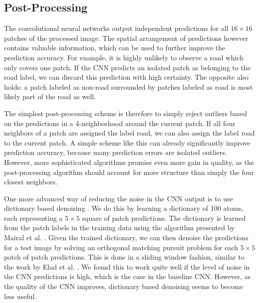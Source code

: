 \documentclass[10pt,conference,compsocconf]{IEEEtran}
\begin{document}
\subsection{Post-Processing}
The convolutional neural networks output independent predictions for all $ 16 \times 16 $ patches of the processed image. The spatial arrangement of predictions however contains valuable information, which can be used to further improve the prediction accuracy. For example, it is highly unlikely to observe a road which only covers one patch. If the CNN predicts an isolated patch as belonging to the road label, we can discard this prediction with high certainty. The opposite also holds: a patch labeled as non-road surrounded by patches labeled as road is most likely part of the road as well.

\par 
The simplest post-processing scheme is therefore to simply reject outliers based on the predictions in a 4-neighborhood around the current patch. If all four neighbors of a patch are assigned the label road, we can also assign the label road to the current patch. A simple scheme like this can already significantly improve prediction accuracy, because many prediction errors are isolated outliers. However, more sophisticated algorithms promise even more gain in quality, as the post-processing algorithm should account for more structure than simply the four closest neighbors.

\par 
One more advanced way of reducing the noise in the CNN output is to use dictionary based denoising \cite{Elad.2006}. We do this by learning a dictionary of 100 atoms, each representing a  $ 5 \times 5 $ square of patch predictions. The dictionary is learned from the patch labels in the training data using the algorithm presented by Mairal et al. \cite{Mairal.2009}. Given the trained dictionary, we can then denoise the predictions for a test image by solving an orthogonal matching pursuit problem for each $ 5 \times 5 $ patch of patch predictions. This is done in a sliding window fashion, similar to the work by Elad et al. \cite{Elad.2006}. We found this to work quite well if the level of noise in the CNN predictions is high, which is the case in the baseline CNN. However, as the quality of the CNN improves, dictionary based denoising seems to become less useful.
\end{document}
